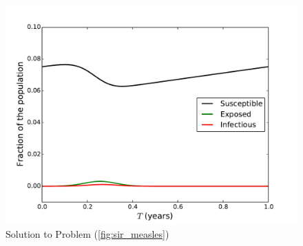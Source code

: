 \begin{figure}[ht]
\centering
\includegraphics[width=\textwidth]{measles.pdf}
\caption{Solution to Problem (\ref{fig:sir_measles})}
\label{sir4}
\end{figure}

